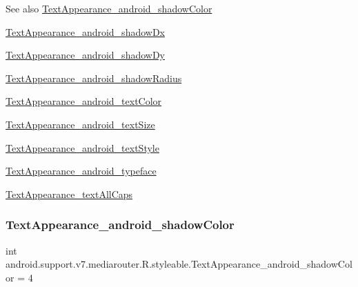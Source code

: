 \begin{DoxySeeAlso}{See also}
\hyperlink{classandroid_1_1support_1_1v7_1_1mediarouter_1_1R_1_1styleable_a6b97baff4bc894f0d6c987535d7f3a5a}{Text\+Appearance\+\_\+android\+\_\+shadow\+Color} 

\hyperlink{classandroid_1_1support_1_1v7_1_1mediarouter_1_1R_1_1styleable_a81de478b4358f0d70081daf1c09c22be}{Text\+Appearance\+\_\+android\+\_\+shadow\+Dx} 

\hyperlink{classandroid_1_1support_1_1v7_1_1mediarouter_1_1R_1_1styleable_a89a0ca76b46147ac109fdca933ba7ae0}{Text\+Appearance\+\_\+android\+\_\+shadow\+Dy} 

\hyperlink{classandroid_1_1support_1_1v7_1_1mediarouter_1_1R_1_1styleable_aaa832bf0610d5cc0cce43c775bdea573}{Text\+Appearance\+\_\+android\+\_\+shadow\+Radius} 

\hyperlink{classandroid_1_1support_1_1v7_1_1mediarouter_1_1R_1_1styleable_a650b9a9477f454927072818d18f15b8c}{Text\+Appearance\+\_\+android\+\_\+text\+Color} 

\hyperlink{classandroid_1_1support_1_1v7_1_1mediarouter_1_1R_1_1styleable_a9988f4dbc2f3276bd7a8362c792b2fff}{Text\+Appearance\+\_\+android\+\_\+text\+Size} 

\hyperlink{classandroid_1_1support_1_1v7_1_1mediarouter_1_1R_1_1styleable_a2af45fccc46df62e5eebf47ba223c488}{Text\+Appearance\+\_\+android\+\_\+text\+Style} 

\hyperlink{classandroid_1_1support_1_1v7_1_1mediarouter_1_1R_1_1styleable_a39493f01673ec164f3f21508901be8ef}{Text\+Appearance\+\_\+android\+\_\+typeface} 

\hyperlink{classandroid_1_1support_1_1v7_1_1mediarouter_1_1R_1_1styleable_ab8377ae9b2955b9b7e3a0ac98b305840}{Text\+Appearance\+\_\+text\+All\+Caps} 
\end{DoxySeeAlso}
\mbox{\label{classandroid_1_1support_1_1v7_1_1mediarouter_1_1R_1_1styleable_a6b97baff4bc894f0d6c987535d7f3a5a}} 
\subsubsection{\texorpdfstring{Text\+Appearance\+\_\+android\+\_\+shadow\+Color}{TextAppearance\_android\_shadowColor}}
{\footnotesize\ttfamily int android.\+support.\+v7.\+mediarouter.\+R.\+styleable.\+Text\+Appearance\+\_\+android\+\_\+shadow\+Color = 4\hspace{0.3cm}{\ttfamily [static]}}

